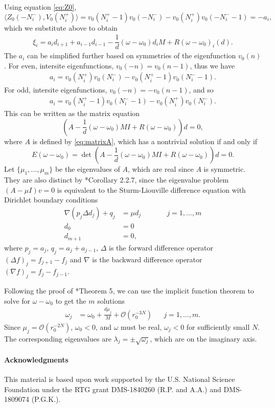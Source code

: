 \documentclass[12pt,reqno]{amsart}
\begin{document}
Using equation \cref{eq:Z0},
\[
\langle Z_0(-N_i^-), V_0(N_i^+) \rangle 
= v_0(N_i^+ - 1)v_0(-N_i^-) - v_0(N_i^+)v_0(-N_i^- - 1) = -a_i,
\]
which we substitute above to obtain
\begin{align}\label{eq:xifinal}
\xi_i = a_i d_{i+1}
+ a_{i-1} d_{i-1}
- \dfrac{1}{d} (\omega - \omega_0) d_i M 
+ R(\omega - \omega_0)_i(d).
\end{align}
The $a_i$ can be simplified further based on symmetries of the eigenfunction $v_0(n)$. For even, intersite eigenfunctions, $v_0(-n) = v_0(n-1)$, thus we have
\begin{align}\label{eq:aievenintersite}
a_i = v_0(N_i^+)v_0(N_i^-) - v_0(N_i^+ - 1)v_0(N_i^- -1).
\end{align}
For odd, intersite eigenfunctions, $v_0(-n) = -v_0(n-1)$, and so
\begin{align}\label{eq:aioddintersite}
	a_i = v_0(N_i^+ - 1)v_0(N_i^- -1) - v_0(N_i^+)v_0(N_i^-).
\end{align}
This can be written as the matrix equation
\begin{equation}\label{eq:matrixAeq}
	\left( A - \frac{1}{d}(\omega - \omega_0)MI + R(\omega-\omega_0)\right)d = 0,
\end{equation}
where $A$ is defined by \cref{eq:matrixA}, which has a nontrivial solution if and only if
\begin{equation}\label{eq:matrixdeteq}
	E(\omega - \omega_0) = 
	\det \left( A - \frac{1}{d}(\omega - \omega_0)MI + R(\omega-\omega_0)\right)d = 0.
\end{equation}
Let $\{ \mu_1, \dots, \mu_{m} \}$ be the eigenvalues of $A$, which are real since $A$ is symmetric. They are also distinct by \cite{Jirari1995}*{Corollary 2.2.7}, since the eigenvalue problem $(A - \mu I) v = 0$ is equivalent to the Sturm-Liouville difference equation with Dirichlet boundary conditions
\begin{equation*}
\begin{aligned}
\nabla( p_j \Delta d_j ) + q_j &= \mu d_j && \qquad j = 1, \dots, m \\
d_0 &= 0 \\
d_{m+1} &= 0,
\end{aligned}
\end{equation*}
where $p_j = a_j$, $q_j = a_j + a_{j-1}$, $\Delta$ is the forward difference operator $(\Delta f)_j = f_{j+1} - f_j$ and $\nabla$ is the backward difference operator $(\nabla f)_j = f_j - f_{j-1}$. 

Following the proof of \cite{Parker2020}*{Theorem 5}, we can use the implicit function theorem to solve for $\omega - \omega_0$ to get the $m$ solutions
\begin{align*}
	\omega_j &= \omega_0 + \frac{d \mu_j}{M} + \mathcal{O}(r_0^{-3N}) && j = 1, \dots, m.
\end{align*}
Since $\mu_j = \mathcal{O}(r_0^{-2N})$, $\omega_0 < 0$, and $\omega$ must be real, $\omega_j < 0$ for sufficiently small $N$. The corresponding eigenvalues are $\lambda_j = \pm \sqrt{\omega_j}$, which are on the imaginary axis.\\

\paragraph{Acknowledgments}

This material is based upon work supported by the U.S. National Science Foundation under the RTG grant DMS-1840260 (R.P. and A.A.)
and DMS-1809074 (P.G.K.).



\end{document}

